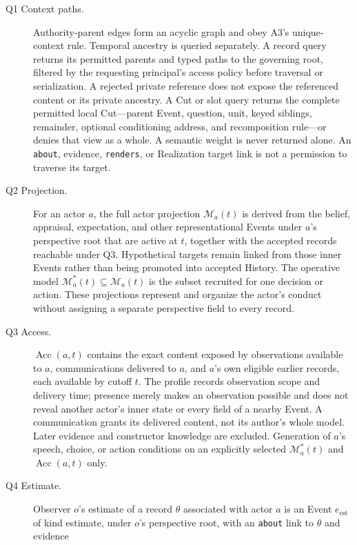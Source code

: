 \documentclass[11pt,a4paper]{article}
\begin{document}
\begin{description}
  \item[Q1 Context paths.] Authority-parent edges form an acyclic graph and
    obey A3's unique-context rule. Temporal ancestry is queried separately.
    A record query returns its permitted parents and typed paths to the
    governing root, filtered by the requesting principal's access policy
    before traversal or serialization. A rejected private reference does not
    expose the referenced content or its private ancestry. A Cut or slot
    query returns the complete permitted local Cut---parent Event, question,
    unit, keyed siblings, remainder, optional conditioning address, and
    recomposition rule---or denies that view as a whole. A semantic weight
    is never returned alone. An \texttt{about}, evidence, \texttt{renders},
    or Realization target link is not a permission to traverse its target.
  \item[Q2 Projection.] For an actor $a$, the full actor projection
    $\mathcal M_a(t)$ is derived
    from the belief, appraisal, expectation, and other representational Events
    under $a$'s perspective root that are active at $t$, together with the accepted records
    reachable under Q3. Hypothetical targets remain linked from those inner
    Events rather than being promoted into accepted History. The operative
    model $\mathcal M^{*}_a(t)\subseteq\mathcal M_a(t)$ is the subset recruited
    for one decision or action. These projections represent and organize the
    actor's conduct without assigning a separate perspective field to every record.
  \item[Q3 Access.] $\operatorname{Acc}(a,t)$ contains the exact content
    exposed by observations available to $a$, communications delivered to $a$,
    and $a$'s own eligible earlier records, each available by cutoff $t$.
    The profile records observation scope and delivery time; presence merely
    makes an observation possible and does not reveal another actor's inner
    state or every field of a nearby Event. A communication grants its
    delivered content, not its author's whole model. Later evidence and
    constructor knowledge are excluded. Generation of $a$'s speech, choice, or action
    conditions on an explicitly selected $\mathcal M^{*}_a(t)$ and
    $\operatorname{Acc}(a,t)$ only.
  \item[Q4 Estimate.] Observer $o$'s estimate of a record $\theta$ associated
    with actor $a$ is an Event $e_{\mathrm{est}}$ of kind \textsf{estimate},
    under $o$'s perspective root, with an \texttt{about} link to $\theta$ and evidence

\end{description}
\end{document}
